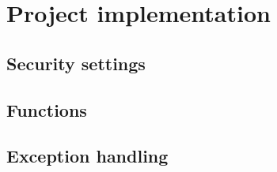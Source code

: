 \chapter{Project implementation}

\section{Security settings}

\section{Functions}

\section{Exception handling}
